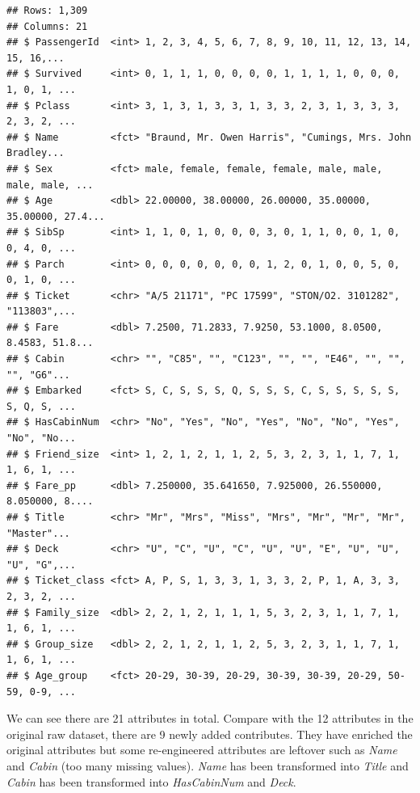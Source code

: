 \documentclass[
]{book}
\begin{document}
\begin{verbatim}
## Rows: 1,309
## Columns: 21
## $ PassengerId  <int> 1, 2, 3, 4, 5, 6, 7, 8, 9, 10, 11, 12, 13, 14, 15, 16,...
## $ Survived     <int> 0, 1, 1, 1, 0, 0, 0, 0, 1, 1, 1, 1, 0, 0, 0, 1, 0, 1, ...
## $ Pclass       <int> 3, 1, 3, 1, 3, 3, 1, 3, 3, 2, 3, 1, 3, 3, 3, 2, 3, 2, ...
## $ Name         <fct> "Braund, Mr. Owen Harris", "Cumings, Mrs. John Bradley...
## $ Sex          <fct> male, female, female, female, male, male, male, male, ...
## $ Age          <dbl> 22.00000, 38.00000, 26.00000, 35.00000, 35.00000, 27.4...
## $ SibSp        <int> 1, 1, 0, 1, 0, 0, 0, 3, 0, 1, 1, 0, 0, 1, 0, 0, 4, 0, ...
## $ Parch        <int> 0, 0, 0, 0, 0, 0, 0, 1, 2, 0, 1, 0, 0, 5, 0, 0, 1, 0, ...
## $ Ticket       <chr> "A/5 21171", "PC 17599", "STON/O2. 3101282", "113803",...
## $ Fare         <dbl> 7.2500, 71.2833, 7.9250, 53.1000, 8.0500, 8.4583, 51.8...
## $ Cabin        <chr> "", "C85", "", "C123", "", "", "E46", "", "", "", "G6"...
## $ Embarked     <fct> S, C, S, S, S, Q, S, S, S, C, S, S, S, S, S, S, Q, S, ...
## $ HasCabinNum  <chr> "No", "Yes", "No", "Yes", "No", "No", "Yes", "No", "No...
## $ Friend_size  <int> 1, 2, 1, 2, 1, 1, 2, 5, 3, 2, 3, 1, 1, 7, 1, 1, 6, 1, ...
## $ Fare_pp      <dbl> 7.250000, 35.641650, 7.925000, 26.550000, 8.050000, 8....
## $ Title        <chr> "Mr", "Mrs", "Miss", "Mrs", "Mr", "Mr", "Mr", "Master"...
## $ Deck         <chr> "U", "C", "U", "C", "U", "U", "E", "U", "U", "U", "G",...
## $ Ticket_class <fct> A, P, S, 1, 3, 3, 1, 3, 3, 2, P, 1, A, 3, 3, 2, 3, 2, ...
## $ Family_size  <dbl> 2, 2, 1, 2, 1, 1, 1, 5, 3, 2, 3, 1, 1, 7, 1, 1, 6, 1, ...
## $ Group_size   <dbl> 2, 2, 1, 2, 1, 1, 2, 5, 3, 2, 3, 1, 1, 7, 1, 1, 6, 1, ...
## $ Age_group    <fct> 20-29, 30-39, 20-29, 30-39, 30-39, 20-29, 50-59, 0-9, ...
\end{verbatim}

We can see there are 21 attributes in total. Compare with the 12 attributes in the original raw dataset, there are 9 newly added contributes. They have enriched the original attributes but some re-engineered attributes are leftover such as \emph{Name} and \emph{Cabin} (too many missing values). \emph{Name} has been transformed into \emph{Title} and \emph{Cabin} has been transformed into \emph{HasCabinNum} and \emph{Deck}.
\end{document}
